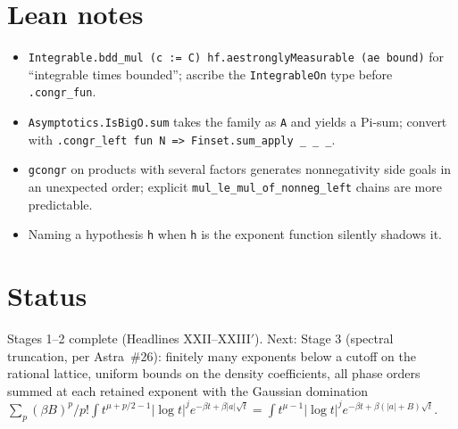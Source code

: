 \documentclass[11pt]{article}
\begin{document}
\section{Lean notes}
\begin{itemize}
\item \texttt{Integrable.bdd\_mul (c := C) hf.aestronglyMeasurable (ae bound)} for ``integrable
  times bounded''; ascribe the \texttt{IntegrableOn} type before \texttt{.congr\_fun}.
\item \texttt{Asymptotics.IsBigO.sum} takes the family as \texttt{A} and yields a Pi-sum; convert with
  \texttt{.congr\_left fun N => Finset.sum\_apply \_ \_ \_}.
\item \texttt{gcongr} on products with several factors generates nonnegativity side goals in an
  unexpected order; explicit \texttt{mul\_le\_mul\_of\_nonneg\_left} chains are more predictable.
\item Naming a hypothesis \texttt{h} when \texttt{h} is the exponent function silently shadows it.
\end{itemize}

\section{Status}
Stages 1--2 complete (Headlines XXII--XXIII$'$). Next: Stage 3 (spectral truncation, per Astra~\#26):
finitely many exponents below a cutoff on the rational lattice, uniform bounds on the density
coefficients, all phase orders summed at each retained exponent with the Gaussian domination
$\sum_p(\beta B)^p/p!\int t^{\mu+p/2-1}|\log t|^je^{-\beta t+\beta|a|\sqrt t}=\int t^{\mu-1}|\log t|^j
e^{-\beta t+\beta(|a|+B)\sqrt t}$.
\end{document}
